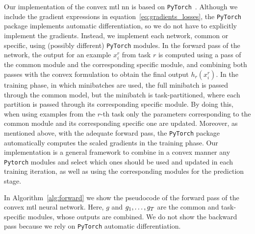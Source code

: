 Our implementation of the convex \acrshort{mtl} \acrshort{nn} is based on \texttt{PyTorch}~\citep{PyTorch}.
Although we include the gradient expressions in equation~\eqref{eq:gradients_losses}, the \texttt{PyTorch} package implements automatic differentiation, so we do not have to explicitly implement the gradients.
Instead, we implement each network, common or specific, using (possibly different) \texttt{PyTorch} modules.
In the forward pass of the network, the output for an example $x_i^r$ from task $r$ is computed using a pass of the common module and the corresponding specific module, and combining both passes with the convex formulation to obtain the final output $h_r(x_i^r)$.
In the training phase, in which minibatches are used, the full minibatch is passed through the common model, but the minibatch is task-partitioned, where each partition is passed through its corresponding specific module.
By doing this, when using examples from the $r$-th task only the parameters corresponding to the common module and its corresponding specific one are updated.
Moreover, as mentioned above, with the adequate forward pass, the \texttt{PyTorch} package automatically computes the scaled gradients in the training phase.
Our implementation is a general framework to combine in a convex manner any   \texttt{Pytorch} modules and select which ones should be used and updated in each training iteration, as well as using the corresponding modules for the prediction stage.

{In Algorithm~\ref{alg:forward} we show the pseudocode of the forward pass of the convex \acrshort{mtl} neural network. Here, $g$ and $g_1, \ldots, g_T$ are the common and task-specific modules, whose outputs are combined. We do not show the backward pass because we rely on \texttt{PyTorch} automatic differentiation.}



















